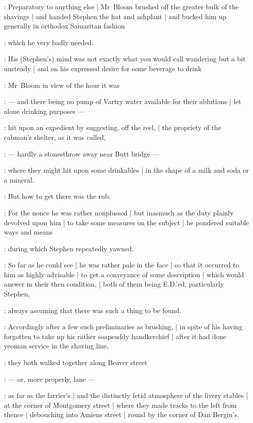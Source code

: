 \newpage


\setcounter{page}{1}

:
Preparatory to anything else |
Mr~Bloom brushed off the greater bulk of the shavings |
and handed Stephen the hat and ashplant |
and bucked him up generally in orthodox Samaritan fashion

:
which he very badly needed.

:
His (Stephen's) mind was not exactly what you would call wandering but a bit unsteady |
and on his expressed desire for some beverage to drink

:
Mr~Bloom in view of the hour it was

:
    --- and there being no pump of Vartry water available for their ablutions |
        let alone drinking purposes ---

:
hit upon an expedient by suggesting, off the reel, |
the propriety of the cabman's shelter, as it was called,

:
    --- hardly a stonesthrow away near Butt bridge ---

:
where they might hit upon some drinkables |
in the shape of a milk and soda or a mineral.

:
But how to get there was the rub.

:
For the nonce he was rather nonplussed |
but inasmuch as the duty plainly devolved upon him |
to take some measures on the subject |
he pondered suitable ways and means

:
during which Stephen repeatedly yawned.

:
So far as he could see |
he was rather pale in the face |
so that it occurred to him as highly advisable |
to get a conveyance of some description |
which would answer in their then condition, |
both of them being E.D.'ed, particularly Stephen,

:
always assuming that there was such a thing to be found.

:
Accordingly after a few such preliminaries as brushing, |
in spite of his having forgotten to take up his rather soapsuddy handkerchief |
after it had done yeoman service in the shaving line,

:
they both walked together along Beaver street

:
    --- or, more properly, lane ---

:
as far as the farrier's |
and the distinctly fetid atmosphere of the livery stables |
at the corner of Montgomery street |
where they made tracks to the left from thence |
debouching into Amiens street |
round by the corner of Dan Bergin's.

